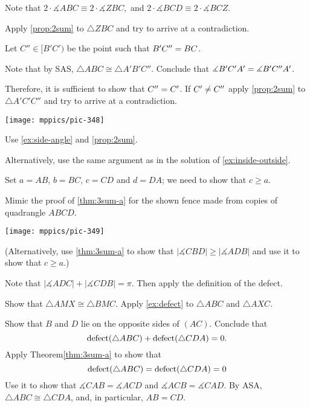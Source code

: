 \begin{multicols}{2}
Note that 
$
2\cdot \measuredangle ABC\equiv 2\cdot \measuredangle ZBC,
$ and
$2\cdot \measuredangle BCD\equiv 2\cdot \measuredangle BCZ$.

Apply \ref{prop:2sum} to $\triangle ZBC$ and try to arrive at a contradiction.

Let $C''\in [B'C')$ be the point such that $B'C''\z=BC$.

Note that by SAS, $\triangle ABC\cong \triangle A'B'C''$.
Conclude that $\measuredangle B'C'A'\z= \measuredangle B'C''A'$.

Therefore, it is sufficient to show that $C''\z=C'$.
If $C'\z\ne C''$ apply \ref{prop:2sum} to $\triangle A'C'C''$ and try to arrive at a contradiction.


\begin{Figure}
\vskip-0mm
\centering
\texttt{[image: mppics/pic-348]}
\end{Figure}


Use \ref{ex:side-angle} and \ref{prop:2sum}.

Alternatively, use the same argument as in the solution of \ref{ex:inside-outside}.

Set $a=AB$, $b=BC$, $c=CD$ and $d=DA$; we need to show that $c\ge a$.

Mimic the proof of \ref{thm:3sum-a} for the shown fence made from copies of quadrangle $ABCD$.

\begin{Figure}
\vskip-0mm
\centering
\texttt{[image: mppics/pic-349]}
\end{Figure}

(Alternatively, use \ref{thm:3sum-a} to show that $|\measuredangle CBD|\ge|\measuredangle ADB|$ and use it to show that $c\ge a$.)

Note that 
$|\measuredangle ADC|+|\measuredangle CDB|=\pi$.
Then apply the definition of the defect.

Show that $\triangle AMX\cong \triangle BMC$. 
Apply \ref{ex:defect} to $\triangle ABC$ and $\triangle AXC$.


Show that $B$ and $D$ lie on the opposite sides of $(AC)$.
Conclude that 
\[\mathop{\rm defect}\nolimits(\triangle ABC)+\mathop{\rm defect}\nolimits(\triangle CDA)=0.\]
Apply Theorem\ref{thm:3sum-a} to show that 
\[\mathop{\rm defect}\nolimits(\triangle ABC)=\mathop{\rm defect}\nolimits(\triangle CDA)=0\]
Use it to show that $\measuredangle CAB=\measuredangle ACD$ and $\measuredangle ACB=\measuredangle CAD$.
By ASA, $\triangle ABC\cong\triangle CDA$, and, in particular, $AB=CD$.


\end{multicols}
